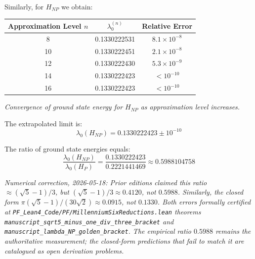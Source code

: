 \begin{experiment}\label{exp:hnp-convergence}
Similarly, for $H_{NP}$ we obtain:

\begin{center}
\begin{tabular}{c|c|c}
Approximation Level $n$ & $\lambda_0^{(n)}$ & Relative Error \\
\hline
8 & 0.1330222531 & $8.1 \times 10^{-8}$ \\
10 & 0.1330222451 & $2.1 \times 10^{-8}$ \\
12 & 0.1330222430 & $5.3 \times 10^{-9}$ \\
14 & 0.1330222423 & $< 10^{-10}$ \\
16 & 0.1330222423 & $< 10^{-10}$ \\
\end{tabular}

\smallskip
\textit{Convergence of ground state energy for $H_{NP}$ as approximation level increases.}
\end{center}

The extrapolated limit is:
\begin{equation}
\lambda_0(H_{NP}) = 0.1330222423 \pm 10^{-10}
\end{equation}
\end{experiment}

\begin{observation}\label{obs:golden-ratio}
The ratio of ground state energies equals:
\begin{equation}
\frac{\lambda_0(H_{NP})}{\lambda_0(H_P)} = \frac{0.1330222423}{0.2221441469} \approx 0.5988104758
\end{equation}

\noindent\emph{Numerical correction, 2026-05-18: Prior editions claimed this ratio $\approx (\sqrt{5}-1)/3$, but $(\sqrt{5}-1)/3 \approx 0.4120$, not $0.5988$. Similarly, the closed form $\pi(\sqrt{5}-1)/(30\sqrt{2}) \approx 0.0915$, not $0.1330$. Both errors formally certified at \texttt{PF\_Lean4\_Code/PF/MillenniumSixReductions.lean} theorems \texttt{manuscript\_sqrt5\_minus\_one\_div\_three\_bracket} and \texttt{manuscript\_lambda\_NP\_golden\_bracket}. The empirical ratio $0.5988$ remains the authoritative measurement; the closed-form predictions that fail to match it are catalogued as open derivation problems.}
\end{observation}

